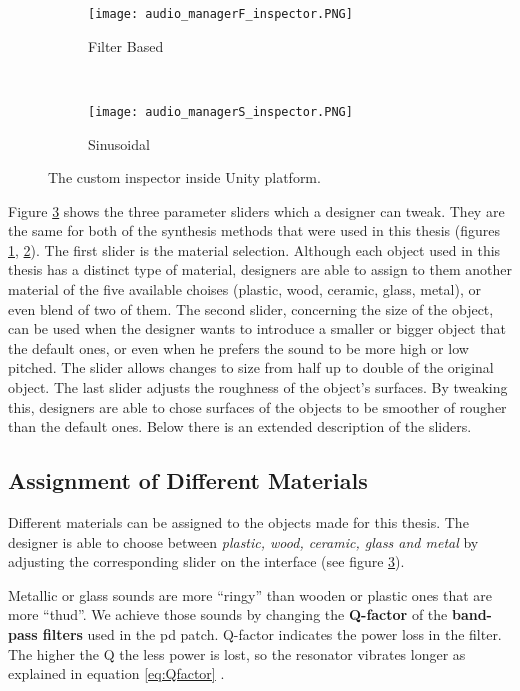 \begin{figure}[H]
    \centering
    \begin{subfigure}[b]{0.4\textwidth}
        \texttt{[image: audio\_managerF\_inspector.PNG]}
        \caption{Filter Based}
        \label{fig:FB}
    \end{subfigure}
    ~ %
    \begin{subfigure}[b]{0.4\textwidth}
        \texttt{[image: audio\_managerS\_inspector.PNG]}
        \caption{Sinusoidal}
        \label{fig:sin}
    \end{subfigure}
    \caption{The custom inspector inside Unity platform.}\label{fig:custom_insp}
\end{figure}

Figure \ref{fig:custom_insp} shows the three parameter sliders which a designer can tweak. They are the same for both of the synthesis methods that were used in this thesis (figures \ref{fig:FB}, \ref{fig:sin}). The first slider is the material selection. Although each object used in this thesis has a distinct type of material, designers are able to assign to them another material of the five available choises (plastic, wood, ceramic, glass, metal), or even blend of two of them. The second slider, concerning the size of the object, can be used when the designer wants to introduce a smaller or bigger object that the default ones, or even when he prefers the sound to be more high or low pitched. The slider allows changes to size from half up to double of the original object. The last slider adjusts the roughness of the object's surfaces. By tweaking this, designers are able to chose surfaces of the objects to be smoother of rougher than the default ones. Below there is an extended description of the sliders.

\subsection{Assignment of Different Materials}
Different materials can be assigned to the objects made for this thesis. The designer is able to choose between \textit{plastic, wood, ceramic, glass and metal} by adjusting the corresponding slider on the interface (see figure \ref{fig:custom_insp}). 

Metallic or glass sounds are more ``ringy'' than wooden or plastic ones that are more ``thud''. We achieve those sounds by changing the \textbf{Q-factor} of the \textbf{band-pass filters} used in the pd patch. Q-factor indicates the power loss in the filter. The higher the Q the less power is lost, so the resonator vibrates longer as explained in equation \ref{eq:Qfactor} \cite{bib:Q}.

